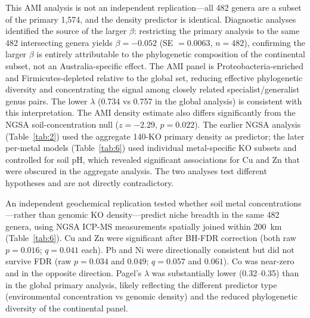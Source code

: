 \documentclass[times]{zHenriquesLab-StyleBioRxiv}
\begin{document}
This AMI analysis is not an independent replication---all 482 genera
are a subset of the primary 1,574, and the density predictor is identical.
Diagnostic analyses identified the source of the larger $\beta$: restricting
the primary analysis to the same 482 intersecting genera yields $\beta = -0.052$
(SE $= 0.0063$, $n = 482$), confirming the larger $\beta$ is entirely
attributable to the phylogenetic composition of the continental subset, not an
Australia-specific effect. The AMI panel is Proteobacteria-enriched and
Firmicutes-depleted relative to the global set, reducing effective phylogenetic
diversity and concentrating the signal among closely related specialist/generalist
genus pairs. The lower $\lambda$ (0.734 vs 0.757 in the global analysis) is
consistent with this interpretation. The AMI density estimate also
differs significantly from the NGSA soil-concentration null ($z = -2.29$, $p = 0.022$).
The earlier NGSA analysis (Table~\ref{tab:2}) used the aggregate 140-KO primary
density as predictor; the later per-metal models (Table~\ref{tab:6}) used
individual metal-specific KO subsets and controlled for soil pH, which revealed
significant associations for Cu and Zn that were obscured in the aggregate
analysis. The two analyses test different hypotheses and are not directly
contradictory.

An independent geochemical replication tested whether soil metal
concentrations---rather than genomic KO density---predict niche breadth in the
same 482 genera, using NGSA ICP-MS measurements spatially joined within 200~km
(Table~\ref{tab:6}). Cu and Zn were significant after BH-FDR correction
(both raw $p = 0.016$; $q = 0.041$ each). Pb and Ni were directionally consistent
but did not survive FDR (raw $p = 0.034$ and $0.049$; $q = 0.057$ and $0.061$). Co was near-zero and in the opposite direction.
Pagel's $\lambda$ was substantially lower (0.32--0.35) than in the global
primary analysis, likely reflecting the different predictor type (environmental
concentration vs genomic density) and the reduced phylogenetic diversity of the
continental panel.
\end{document}
